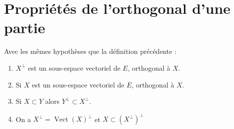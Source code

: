 \documentclass[../main.tex]{subfiles}
\begin{document}
\section{Propriétés de l'orthogonal d'une partie}
\begin{tcolorbox}[title=Propostion 34.34, title filled=false, colframe=lightblue, colback=lightblue!10!white]
    Avec les mêmes hypothèses que la définition précédente : 
    \begin{enumerate}
        \item $X^\bot$ est un sous-espace vectoriel de $E$, orthogonal à $X$. 
        \item Si $X$ est un sous-espace vectoriel de $E$, orthogonal à $X$. 
        \item Si $X\subset Y$ alors $Y^\bot \subset X^\bot$.
        \item On a $X^\bot = \operatorname{Vect}(X)^\bot$ et $X\subset (X^\bot)^\bot$
    \end{enumerate}
\end{tcolorbox}
\end{document}
